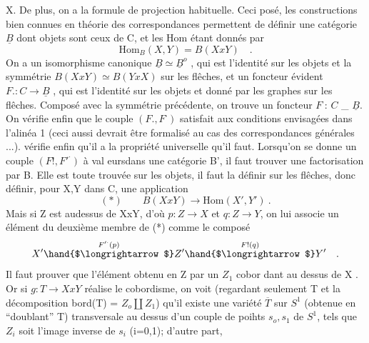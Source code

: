X. De plus, on a la formule  de projection habituelle. Ceci posé, les
constructions bien connues en théorie des correspondances permettent
de définir une catégorie $\underline{B}$ dont  objets sont ceux de C, et les
Hom étant donnés par
\[ \mathrm{Hom}_{B}(X,Y) = B(XxY) \quad . \]
On a un isomorphisme canonique $\underline{B} \simeq \underline{B}^{o}$ , qui est l'identité sur les
objets et la symmétrie $B(XxY)\simeq B(YxX)$ sur les flêches, et un foncteur
évident  $F. : C \to \underline{B}$ , qui est l'identité sur les objets et donné
par les graphes sur les flêches. Composé avec la symmétrie précédente,
on trouve un foncteur $F^{\cdot}$:  $C$ \_ $\underline{B}$. On vérifie enfin que le couple
$(F.,F^{\cdot})$ satisfait aux conditions envisagées dans l'alinéa 1 (ceci aussi
devrait être formalisé au cas des correspondances générales ...). 
vérifie enfin qu'il a la propriété universelle qu'il faut. Lorsqu'on
se donne un couple $(F!,F'^{\cdot})$ à val eursdans une catégorie B', il faut
trouver une factorisation par B. Elle est toute trouvée sur les
objets, il faut la définir sur les flêches, donc définir, pour X,Y
dans C, une application
\[ (*) \qquad B(XxY) \to \mathrm{Hom}(X',Y') \ . \]
Mais si Z est audessus de XxY, d'où $p:Z\to X$ et $q:Z\to Y$, on lui associe
un élément du deuxième membre de (*) comme le composé
\[ X' \overset{F'^{\cdot}(p)}{\hand{$\longrightarrow$}} Z' \overset{F!(q)}{\hand{$\longrightarrow$}} Y' \quad . \]
Il faut prouver que l'élément obtenu en  Z  par un $Z_1$ cobor
dant au dessus de X . Or si $g: T\to XxY$ réalise le cobordisme, on
voit (regardant seulement T et la décomposition bord(T) = $Z_{o}\amalg Z_1$)
qu'il existe une variété $\overline{T}$ sur $S^1$ (obtenue en ``doublant'' T) 
 transversale au dessus d'un couple de poihts $s_o,s_1$
de $S^1$, tels que $Z_i$ soit l'image inverse  de $s_i$ (i=0,1); d'autre part,

